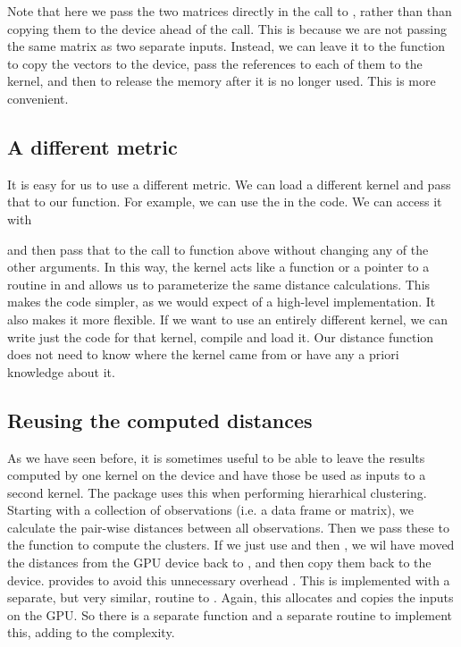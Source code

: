 Note that here we pass the two matrices directly in the call to
, rather than than copying them to the device ahead of the
call.  This is because we are not passing the same matrix as two
separate inputs.  Instead, we can leave it to the 
function to copy the vectors to the device, pass the references
to each of them to the kernel, and then to release the memory 
after it is no longer used. This is more convenient.


\subsection{A different metric}
It is easy for us to use a different metric.  We can load a different
kernel and pass that to our function. 
For example, we can use the  in the
 code.
We can access it with 
and then pass that to the call to  function above without
changing any of the other arguments.  In this way, the kernel acts
like a function or a pointer to a routine in \C{} and allows us to
parameterize the same distance calculations.  This makes the code
simpler, as we would expect of a high-level implementation.  It also
makes it more flexible. If we want to use an entirely different
kernel, we can write just the code for that kernel, compile and load
it.  Our distance function does not need to know where the kernel came
from or have any a priori knowledge about it.


\subsection{Reusing the computed distances}
As we have seen before, it is sometimes useful to be able to leave the
results computed by one kernel on the device and have those be used as
inputs to a second kernel.  The  package uses this when
performing hierarhical clustering.  Starting with a collection of
observations (i.e. a data frame or matrix), we calculate the pair-wise
distances between all observations.  Then we pass these to the
 function to compute the clusters.  If we just use
 and then , we wil have moved the
distances from the GPU device back to \R, and then copy them back to
the device.   provides  to avoid
this unnecessary overhead .  This is implemented with a separate, but
very similar, routine to .  Again, this allocates and
copies the inputs on the GPU.  So there is a separate \R{} function
and a separate \C{} routine to implement this, adding to the
complexity.

